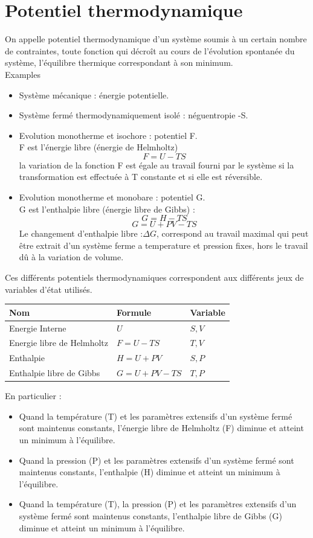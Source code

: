 \documentclass[12pt,oneside]{book}
\begin{document}
\section{Potentiel thermodynamique}
On appelle potentiel thermodynamique d'un système soumis à un certain nombre de contraintes, toute fonction qui décroît au cours de l'évolution spontanée du système, l'équilibre thermique correspondant à son minimum. \\
Examples
\begin{itemize}
    \item Système mécanique : énergie potentielle.
    \item Système fermé thermodynamiquement isolé : néguentropie -S.
    \item Evolution monotherme  et isochore : potentiel F.\\
          F est l’énergie libre (énergie de Helmholtz)
          \[F = U - TS\]
          la variation de la fonction F est égale au travail fourni par le système si la transformation est effectuée à T constante et si elle est réversible.
    \item Evolution monotherme  et monobare : potentiel G.\\
          G est l'enthalpie libre (énergie libre de Gibbs) :
          \[G = H-TS\]
          \[G =U+PV-TS\]
          Le changement d'enthalpie libre :$\Delta G$, correspond au travail maximal qui peut être extrait d'un système ferme a temperature et pression fixes, hors le travail dû à la variation de volume.
\end{itemize}
Ces différents potentiels thermodynamiques correspondent aux différents jeux de variables d'état utilisés.
\begin{center}
    \begin{tabular}{|l|l|l|}
        \hline
        Nom                        & Formule        & Variable \\ \hline
        Energie Interne            & $U$            & $S,V$    \\ \hline
        Energie libre de Helmholtz & $F=U-TS$       & $T,V$    \\ \hline
        Enthalpie                  & $H=U+PV$       & $S,P$    \\ \hline
        Enthalpie libre de Gibbs   & $G =U +PV -TS$ & $T,P$    \\ \hline
    \end{tabular}
\end{center}
En particulier :
\begin{itemize}
    \item Quand la température (T) et les paramètres extensifs d'un système fermé sont maintenus constants, l'énergie libre de Helmholtz (F) diminue et atteint un minimum à l'équilibre.
    \item Quand la pression (P) et les paramètres extensifs d'un système fermé sont maintenus constants, l'enthalpie (H) diminue et atteint un minimum à l'équilibre.
    \item  Quand la température (T), la pression (P) et les paramètres extensifs d'un système fermé sont maintenus constants, l'enthalpie libre de Gibbs (G) diminue et atteint un minimum à l'équilibre.
\end{itemize}
\end{document}
